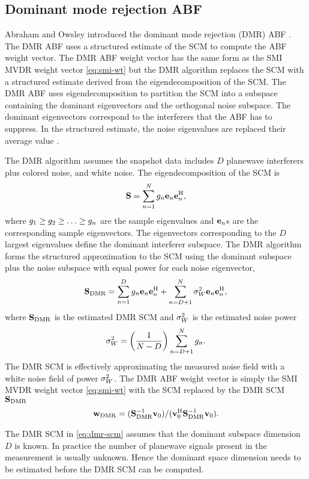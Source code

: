 \subsection{Dominant mode rejection ABF}
\label{sec:dmr-abf}
Abraham and Owsley introduced the dominant mode rejection (DMR) ABF
\cite{abraham1990beamforming}. The DMR ABF uses a structured estimate
of the SCM to compute the ABF weight vector. The DMR ABF weight vector
has the same form as the SMI MVDR weight vector \eqref{eq:smi-wt} but
the DMR algorithm replaces the SCM with a structured estimate derived
from the eigendecomposition of the SCM. The DMR ABF uses
eigendecomposition to partition the SCM into a subspace containing the
dominant eigenvectors and the orthogonal noise subspace. The dominant
eigenvectors correspond to the interferers that the ABF has to
suppress. In the structured estimate, the noise eigenvalues are replaced their average value \cite{vtree2002oap}.

The DMR algorithm assumes the snapshot data includes $D$ planewave
interferers plus colored noise, and white noise. The
eigendecomposition of the SCM is
\[
{\bf S} = \sum\limits_{n = 1}^{N}g_n{\bf e}_n{\bf e}_n^{\rm H},
\]
where $g_1 \geq g_2 \geq \ldots \geq g_n$ are
the sample eigenvalues and ${\bf e}_n$s are the corresponding sample
eigenvectors. The eigenvectors corresponding to the $D$ largest
eigenvalues define the dominant interferer subspace. The DMR algorithm
forms the structured approximation to the SCM using the dominant
subspace plus the noise subspace with equal power for each noise
eigenvector,
\begin{equation}
  \label{eq:dmr-scm}
{\bf S}_{\rm DMR} = \sum\limits_{n = 1}^{D} g_n{\bf e}_n{\bf e}_n^{\rm H} + \sum\limits_{n = D + 1}^{N} \sigma^2_W{\bf e}_n{\bf e}_n^{\rm H},
\end{equation}
where ${\bf S}_{\rm DMR}$ is the estimated DMR SCM and $\sigma^2_W$ is the
estimated noise power
\[
\sigma^2_W = \left( \frac{1}{N - D}\right)\sum\limits_{n = D + 1}^{N}g_n.
\]
The DMR SCM is effectively approximating the measured noise field with
a white noise field of power $\sigma^2_W$.  The DMR ABF weight vector is simply
the SMI MVDR weight vector \eqref{eq:smi-wt} with the SCM replaced by
the DMR SCM ${\bf S}_{\rm DMR}$
\[
{\bf w}_{\rm DMR} = ({\bf S}_{\rm DMR}^{-1}{\bf v}_0)/({\bf v}_0^{\rm H}{\bf S}_{\rm DMR}^{-1}{\bf v}_0).
\]

The DMR SCM in \eqref{eq:dmr-scm} assumes that the dominant subspace dimension $D$ is known. In practice the number of planewave signals present in the measurement is usually unknown. Hence the dominant space dimension needs to be estimated before the DMR SCM can be computed.

